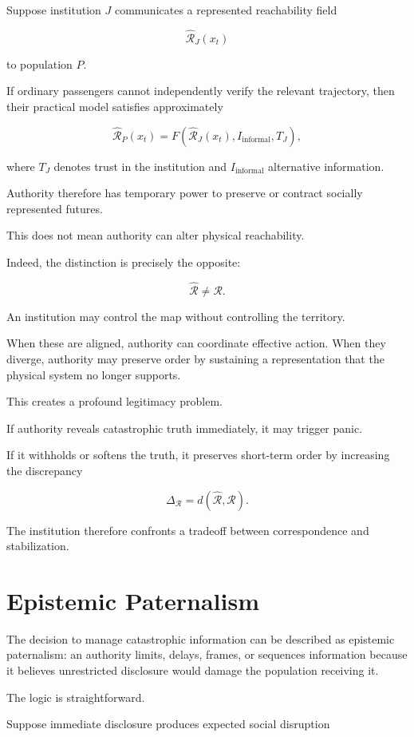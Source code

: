 \documentclass[11pt,oneside]{book}
\theoremstyle{definition}
\theoremstyle{remark}
\newcommand{\R}{\mathcal{R}}
\begin{document}
Suppose institution \(J\) communicates a represented reachability field

\[
\widehat{\R}_J(x_t)
\]

to population \(P\).

If ordinary passengers cannot independently verify the relevant trajectory, then their practical model satisfies approximately

\[
\widehat{\R}_P(x_t)
=
F\!\left(
\widehat{\R}_J(x_t),
I_{\mathrm{informal}},
T_J
\right),
\]

where \(T_J\) denotes trust in the institution and \(I_{\mathrm{informal}}\) alternative information.

Authority therefore has temporary power to preserve or contract socially represented futures.

This does not mean authority can alter physical reachability.

Indeed, the distinction is precisely the opposite:

\[
\widehat{\R}
\neq
\R.
\]

An institution may control the map without controlling the territory.

When these are aligned, authority can coordinate effective action. When they diverge, authority may preserve order by sustaining a representation that the physical system no longer supports.

This creates a profound legitimacy problem.

If authority reveals catastrophic truth immediately, it may trigger panic.

If it withholds or softens the truth, it preserves short-term order by increasing the discrepancy

\[
\Delta_{\R}
=
d(\widehat{\R},\R).
\]

The institution therefore confronts a tradeoff between correspondence and stabilization.

\section{Epistemic Paternalism}

The decision to manage catastrophic information can be described as epistemic paternalism: an authority limits, delays, frames, or sequences information because it believes unrestricted disclosure would damage the population receiving it.

The logic is straightforward.

Suppose immediate disclosure produces expected social disruption
\end{document}
